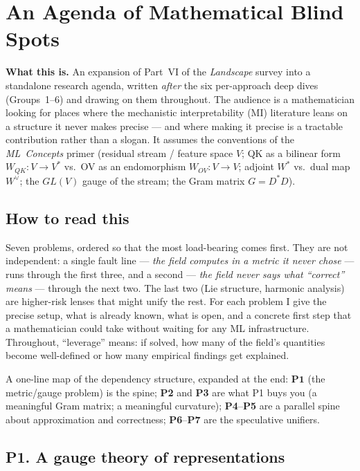 

\section*{An Agenda of Mathematical Blind Spots}

\begin{callout}
\textbf{What this is.} An expansion of Part~VI of the \emph{Landscape} survey into a standalone
research agenda, written \emph{after} the six per-approach deep dives (Groups~1--6) and drawing
on them throughout. The audience is a mathematician looking for places where the mechanistic
interpretability (MI) literature leans on a structure it never makes precise --- and where
making it precise is a tractable contribution rather than a slogan. It assumes the conventions of
the \emph{ML~Concepts} primer (residual stream / feature space $V$; QK as a bilinear form
$W_{QK}:V\to V^{*}$ vs.\ OV as an endomorphism $W_{OV}:V\to V$; adjoint $W^{*}$ vs.\ dual map
$W^{\vee}$; the $GL(V)$ gauge of the stream; the Gram matrix $G=D^{*}D$).
\end{callout}

\subsection*{How to read this}

Seven problems, ordered so that the most load-bearing comes first. They are not independent: a
single fault line --- \emph{the field computes in a metric it never chose} --- runs through the
first three, and a second --- \emph{the field never says what ``correct'' means} --- through the
next two. The last two (Lie structure, harmonic analysis) are higher-risk lenses that might
unify the rest. For each problem I give the precise setup, what is already known, what is open,
and a concrete first step that a mathematician could take without waiting for any ML
infrastructure. Throughout, ``leverage'' means: if solved, how many of the field's quantities
become well-defined or how many empirical findings get explained.

A one-line map of the dependency structure, expanded at the end: $\textbf{P1}$ (the metric/gauge
problem) is the spine; \textbf{P2} and \textbf{P3} are what P1 buys you (a meaningful Gram
matrix; a meaningful curvature); \textbf{P4}--\textbf{P5} are a parallel spine about
approximation and correctness; \textbf{P6}--\textbf{P7} are the speculative unifiers.

\subsection*{P1. A gauge theory of representations}

